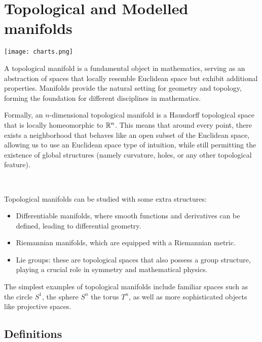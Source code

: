 

\chapter{Topological and Modelled manifolds}
\begin{center}
    \begin{minipage}{0.6\textwidth} %
  \centering
  \texttt{[image: charts.png]}
\end{minipage}
\end{center}

A topological manifold is a fundamental object in mathematics, serving as an abstraction of spaces that locally resemble Euclidean space but  exhibit additional properties. Manifolds provide the natural setting for geometry and topology, forming the foundation for different disciplines in mathematics.

Formally, an $n$-dimensional topological manifold is a Hausdorff topological space that is locally homeomorphic to $\mathbb{R}^n$. This means that around every point, there exists a neighborhood that behaves like an open subset of the Euclidean space, allowing us to use an Euclidean space type of intuition, while still permitting the existence of global structures (namely curvature, holes, or any other topological feature).

\, 

Topological manifolds can be studied with some extra structures:

\begin{itemize}
    \item Differentiable manifolds, where smooth functions and derivatives can be defined, leading to differential geometry.
    \item Riemannian manifolds, which are equipped with a Riemannian metric.
    \item Lie groups: these are topological spaces that also possess a group structure, playing a crucial role in symmetry and mathematical physics.
\end{itemize}
The simplest examples of topological manifolds include familiar spaces such as the circle $S^1$, the sphere $S^n$ the torus $T^n$, as well as more sophisticated objects like projective spaces.
\section{Definitions}

\, 

